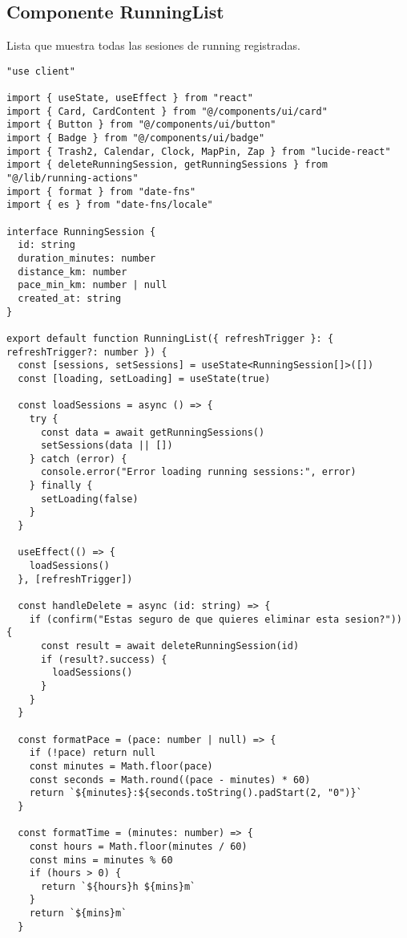 \documentclass[12pt,a4paper]{article}
\begin{document}
\subsection{Componente RunningList}

Lista que muestra todas las sesiones de running registradas.

\begin{lstlisting}[caption=components/running/running-list.tsx - Estructura principal]
"use client"

import { useState, useEffect } from "react"
import { Card, CardContent } from "@/components/ui/card"
import { Button } from "@/components/ui/button"
import { Badge } from "@/components/ui/badge"
import { Trash2, Calendar, Clock, MapPin, Zap } from "lucide-react"
import { deleteRunningSession, getRunningSessions } from "@/lib/running-actions"
import { format } from "date-fns"
import { es } from "date-fns/locale"

interface RunningSession {
  id: string
  duration_minutes: number
  distance_km: number
  pace_min_km: number | null
  created_at: string
}

export default function RunningList({ refreshTrigger }: { refreshTrigger?: number }) {
  const [sessions, setSessions] = useState<RunningSession[]>([])
  const [loading, setLoading] = useState(true)

  const loadSessions = async () => {
    try {
      const data = await getRunningSessions()
      setSessions(data || [])
    } catch (error) {
      console.error("Error loading running sessions:", error)
    } finally {
      setLoading(false)
    }
  }

  useEffect(() => {
    loadSessions()
  }, [refreshTrigger])

  const handleDelete = async (id: string) => {
    if (confirm("Estas seguro de que quieres eliminar esta sesion?")) {
      const result = await deleteRunningSession(id)
      if (result?.success) {
        loadSessions()
      }
    }
  }

  const formatPace = (pace: number | null) => {
    if (!pace) return null
    const minutes = Math.floor(pace)
    const seconds = Math.round((pace - minutes) * 60)
    return `${minutes}:${seconds.toString().padStart(2, "0")}`
  }

  const formatTime = (minutes: number) => {
    const hours = Math.floor(minutes / 60)
    const mins = minutes % 60
    if (hours > 0) {
      return `${hours}h ${mins}m`
    }
    return `${mins}m`
  }


\end{lstlisting}
\end{document}
